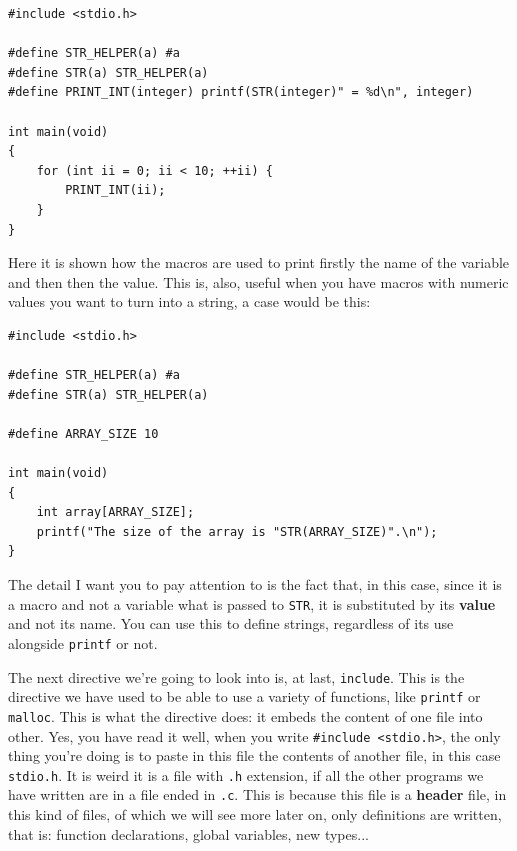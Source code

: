 \documentclass[a4paper]{article}
\begin{document}
\noindent
\begin{minipage}[H]{\linewidth}
\mbox{}
\begin{lstlisting}[style=C,
caption={Macro to stringify},
label={lst:stringifyMacro}]
#include <stdio.h>

#define STR_HELPER(a) #a
#define STR(a) STR_HELPER(a)
#define PRINT_INT(integer) printf(STR(integer)" = %d\n", integer)

int main(void)
{
    for (int ii = 0; ii < 10; ++ii) {
        PRINT_INT(ii);
    }
}
\end{lstlisting}
\end{minipage}

Here it is shown how the macros are used to print firstly the name of the
variable and then then the value. This is, also, useful when you have macros
with numeric values you want to turn into a string, a case would be this:

\noindent
\begin{minipage}[H]{\linewidth}
\mbox{}
\begin{lstlisting}[style=C,
caption={Converting numeric macros to string},
label={lst:stringifyMacroAndMacro}]
#include <stdio.h>

#define STR_HELPER(a) #a
#define STR(a) STR_HELPER(a)

#define ARRAY_SIZE 10

int main(void)
{
    int array[ARRAY_SIZE];
    printf("The size of the array is "STR(ARRAY_SIZE)".\n");
}
\end{lstlisting}
\end{minipage}

The detail I want you to pay attention to is the fact that, in this case, since
it is a macro and not a variable what is passed to \verb!STR!, it is substituted
by its \textbf{value} and not its name. You can use this to define strings,
regardless of its use alongside \verb!printf! or not.

The next directive we're going to look into is, at last, \verb!include!. This is
the directive we have used to be able to use a variety of functions, like
\verb!printf! or \verb!malloc!. This is what the directive does: it embeds the
content of one file into other. Yes, you have read it well, when you write
\verb!#include <stdio.h>!, the only thing you're doing is to paste in this file
the contents of another file, in this case \verb!stdio.h!. It is weird it is a
file with \verb!.h! extension, if all the other programs we have written are
in a file ended in \verb!.c!. This is because this file is a \textbf{header}
file, in this kind of files, of which we will see more later on, only
definitions are written, that is: function declarations, global variables, new
types...
\end{document}
